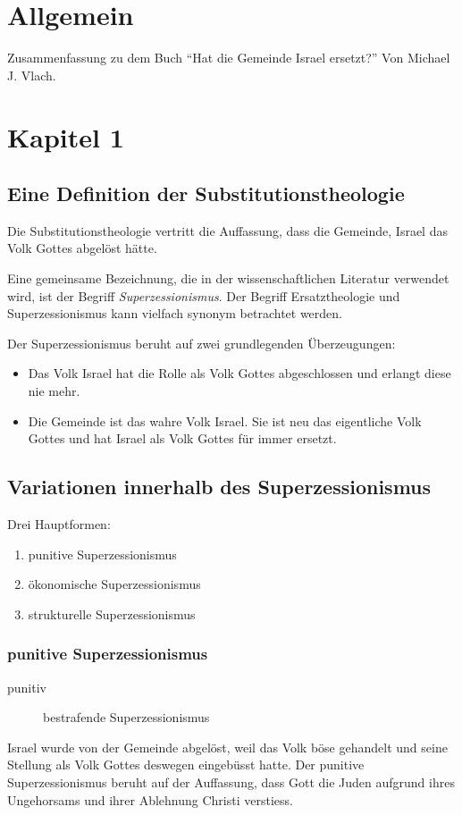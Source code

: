 \documentclass{../../inc/mybib}
\newcommand{\st}{Substitutionstheolog}
\newcommand{\sz}{Superzessionismus}
\begin{document}
    \tableofcontents
    \newpage
    \section{Allgemein}
    Zusammenfassung zu dem Buch \enquote{Hat die Gemeinde Israel ersetzt?} Von Michael J. Vlach.
    \section{Kapitel 1}
    \subsection{Eine Definition der \st{}ie}
    Die Substitutionstheologie vertritt die Auffassung, dass die Gemeinde, Israel das Volk Gottes abgelöst hätte.

    Eine gemeinsame Bezeichnung, die in der wissenschaftlichen Literatur verwendet wird, ist der Begriff \textit{\sz}. Der Begriff Ersatztheologie und \sz{} kann vielfach synonym betrachtet werden.

    Der \sz{} beruht auf zwei grundlegenden Überzeugungen:
    \begin{itemize}
        \item Das Volk Israel hat die Rolle als Volk Gottes abgeschlossen und erlangt diese nie mehr.
        \item Die Gemeinde ist das wahre Volk Israel. Sie ist neu das eigentliche Volk Gottes und hat Israel als Volk Gottes für immer ersetzt.
    \end{itemize}
    \subsection{Variationen innerhalb des \sz{}}
    Drei Hauptformen:
    \begin{enumerate}
        \item punitive \sz
        \item ökonomische \sz
        \item strukturelle \sz
    \end{enumerate}
    \subsubsection{punitive \sz}
    \begin{description}
        \item[punitiv] bestrafende \sz 
    \end{description}
    Israel wurde von der Gemeinde abgelöst, weil das Volk böse gehandelt und seine Stellung als Volk Gottes deswegen eingebüsst hatte.
    Der punitive \sz{} beruht auf der Auffassung, dass Gott die Juden aufgrund ihres Ungehorsams und ihrer Ablehnung Christi verstiess.
    
\end{document}
